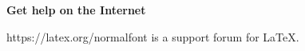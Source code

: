 \documentclass{article}
\begin{document}
\sffamily\bfseries Get help on the Internet

\normalfont\ttfamily https://latex.org/normalfont is a support forum for \LaTeX.
\end{document}
